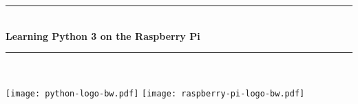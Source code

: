 \makeatletter
\pagecolor{TitleColor}\afterpage{\nopagecolor}
{\color{white}
\begin{titlepage}
 \begin{center}
  {\fontsize{53}{63}\selectfont \textbf{\thetitle}\par}
  \rule{\linewidth}{1.5mm}
  \\[0.4cm]
  {\fontsize{24}{44}\selectfont \color{black} \textbf{Learning Python 3 on the Raspberry Pi}}
\end{center}
\vfill
\hfill
\begin{minipage}{0.62\textwidth}
\begin{flushright}
  {\LARGE \textbf{\theauthor}}
  \rule{\linewidth}{1.0mm}
  \\[0.4cm]
  {\LARGE \color{black} \textbf{\textit{\py@release}}}
 \end{flushright}
 \end{minipage}
\vfill
\texttt{[image: python-logo-bw.pdf]}\hfill
\texttt{[image: raspberry-pi-logo-bw.pdf]}
\end{titlepage}
}
\makeatother
